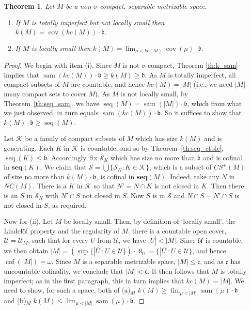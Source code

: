 \documentclass{article}
\newtheorem{thm}{Theorem}[section]
\newcommand{\K}{\mathcal{K}}
\newcommand{\cl}[1]{\overline{#1}}
\DeclareMathOperator{\cof}{cof}
\begin{document}
\begin{thm}\label{th:k=sam}
Let $M$ be a non $\sigma$-compact, separable metrizable space.
\begin{enumerate}[noitemsep,topsep=1pt]
\item[(i)] If $M$ is totally imperfect but not locally small then 
$k(M)=\mathop{cov}(kc(M))\cdot\mathfrak{b}$.

\item[(ii)] If $M$ is locally small then 
$
k(M)=\lim_{\mu < kc(M)} \mathop{cov}(\mu)\cdot\mathfrak{b}$. 
\end{enumerate}
\end{thm}
\begin{proof}
We begin with item (i). Since $M$ is not $\sigma$-compact, Theorem \ref{th:k_sam} implies that $\mathop{sam}(kc(M))\cdot\mathfrak{b} \ge k(M) \ge \mathfrak{b}$.
As $M$ is totally imperfect, all compact subsets of $M$ are countable, and hence $kc(M)=|M|$ (i.e., we need $|M|$-many compact sets to cover $M$). As $M$ is not locally small, by Theorem~\ref{th:seq_sam}, we have $\mathop{seq}(M)=\mathop{sam}(|M|)\cdot\mathfrak{b}$, which from what we just observed, in turn equals $\mathop{sam}(kc(M))\cdot\mathfrak{b}$. 
So it suffices to show that $k(M)\cdot\mathfrak{b} \ge \mathop{seq}(M)$.

Let $\K$ be a family of compact subsets of $M$ which has size $k(M)$ and is generating. Each $K$ in $\K$ is countable, and so by Theorem~\ref{th:seq_ctble}, $\mathop{seq}(K) \le \mathfrak{b}$. Accordingly, fix $\mathcal{S}_K$ which has size no more than $\mathfrak{b}$ and is cofinal in $\mathbf{seq}(K)$. 
We claim that $\mathcal{S}=\bigcup \{ \mathcal{S}_K : K \in \K\}$, which is a subset of $CS^+(M)$ of size no more than $k(M)\cdot\mathfrak{b}$, is cofinal in $\mathbf{seq}(M)$. Indeed, take any $N$ in $NC(M)$. There is a $K$ in $\K$ so that $N'=N \cap K$ is not closed in $K$. Then there is an $S$ in $\mathcal{S}_K$ with $N' \cap S$ not closed in $S$. Now $S$ is in $\mathcal{S}$ and $N\cap S =N'\cap S$ is not closed in $S$, as required.

\smallskip

Now for (ii). Let $M$ be locally small. Then, by definition of `locally small', the Lindel\"{o}f property and the regularity of $M$, there is a countable open cover, $\mathcal{U}=\mathcal{U}_M$, such that for every $U$ from $\mathcal{U}$, we have $|\cl{U}| < |M|$. Since $\cal{U}$ is countable, we then obtain 
$
|M|=(\sup_{} \{|\cl{U}|: U \in \mathcal{U}\})\cdot\aleph_0=\{|\cl{U}|:U \in \mathcal{U}\}$,
and hence $\cof(|M|)=\omega$. Since $M$ is a separable metrizable space, $|M|\leq\mathfrak{c}$, and as $\mathfrak{c}$ has uncountable cofinality, we conclude that $|M|<\mathfrak{c}$. It then follows that $M$ is totally imperfect; as in the first paragraph, this in turn implies that $kc(M)=|M|$. 
We need to show, for such a space, both of (a)${}_M$  $k(M) \ge \lim_{\mu < |M|} \mathop{sam}(\mu) \cdot\mathfrak{b}$ and (b)${}_M$ $k(M) \le \lim_{\mu < |M|} \mathop{sam}(\mu)\cdot\mathfrak{b}$.


\end{proof}
\end{document}
